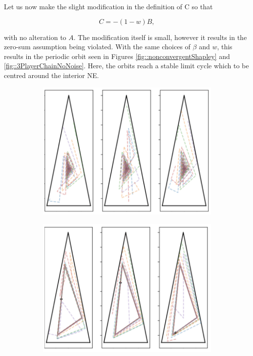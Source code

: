\documentclass{article}
\theoremstyle{definition}
\begin{document}
  Let us now make the slight modification in the definition of C so that

  \begin{equation} \label{eq::nonzeroSumShapley}
    C  = - (1 - w) B, 
  \end{equation}

  with no alteration to $A$. The modification itself is small, however it results in the zero-sum
  assumption being violated. With the same choices of $\beta$ and $w$, this results in the periodic
  orbit seen in Figures \ref{fig::nonconvergentShapley} and \ref{fig::3PlayerChainNoNoise}. Here,
  the orbits reach a stable limit cycle which to be centred around the interior NE.

  \begin{figure}[t]
    \centering
    \begin{subfigure}[b]{0.45 \textwidth}
      \includegraphics[width = \textwidth]{Figures/convergentShapley.png}
    \caption{\label{fig::convergentShapley}}
    \end{subfigure}
    \begin{subfigure}[b]{0.45 \textwidth}
      \includegraphics[width = \textwidth]{Figures/nonConvergentShapley.png}

\end{subfigure}
\end{figure}
\end{document}

